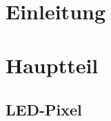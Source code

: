 \begin{figure}
 \\
\end{figure}
\thispagestyle{empty} %
\tableofcontents
\thispagestyle{empty}  
\chapter{Einleitung} 
\chapter{Hauptteil}
\section{LED-Pixel} 
